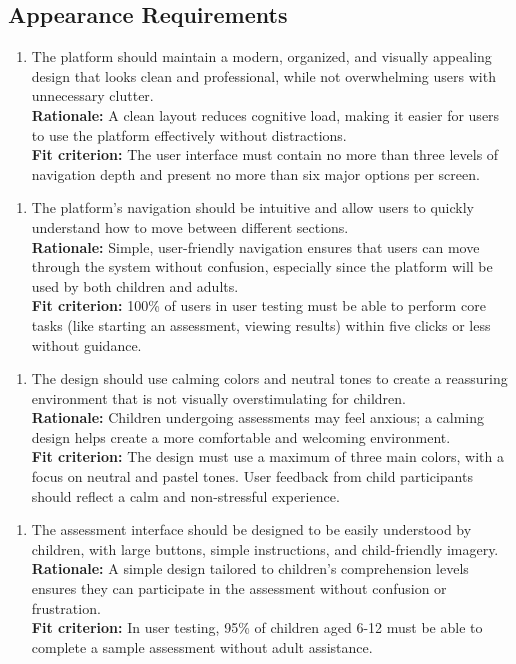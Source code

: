 \documentclass[12pt]{article}
\begin{document}
\subsection{Appearance Requirements}
\begin{enumerate}[{LF-AR}1. ]
  \item The platform should maintain a modern, organized, and visually appealing design that looks clean and professional, while not 
  overwhelming users with unnecessary clutter.\\
  \textbf{Rationale: }A clean layout reduces cognitive load, making it easier for users to use the platform effectively without distractions.\\
  \textbf{Fit criterion: }The user interface must contain no more than three levels of navigation depth and present no more than six major options per screen.  
\end{enumerate}
\begin{enumerate}[{LF-AR}2. ]
  \item The platform’s navigation should be intuitive and allow users to quickly understand how to move between different sections.\\
  \textbf{Rationale: }Simple, user-friendly navigation ensures that users can move through the system without confusion, especially since the platform will be used by both children and adults.\\
  \textbf{Fit criterion: }100\% of users in user testing must be able to perform core tasks (like starting an assessment, viewing results) within five clicks or less without guidance.  
\end{enumerate}
\begin{enumerate}[{LF-AR}3. ]
  \item The design should use calming colors and neutral tones to create a reassuring environment that is not visually overstimulating for children.\\
  \textbf{Rationale: }Children undergoing assessments may feel anxious; a calming design helps create a more comfortable and welcoming environment.\\
  \textbf{Fit criterion: }The design must use a maximum of three main colors, with a focus on neutral and pastel tones. User feedback from child participants should reflect a calm and non-stressful experience.  
\end{enumerate}
\begin{enumerate}[{LF-AR}4. ]
  \item The assessment interface should be designed to be easily understood by children, with large buttons, simple instructions, and child-friendly imagery.\\
  \textbf{Rationale: }A simple design tailored to children’s comprehension levels ensures they can participate in the assessment without confusion or frustration.\\
  \textbf{Fit criterion: }In user testing, 95\% of children aged 6-12 must be able to complete a sample assessment without adult assistance.  
\end{enumerate}
\end{document}
